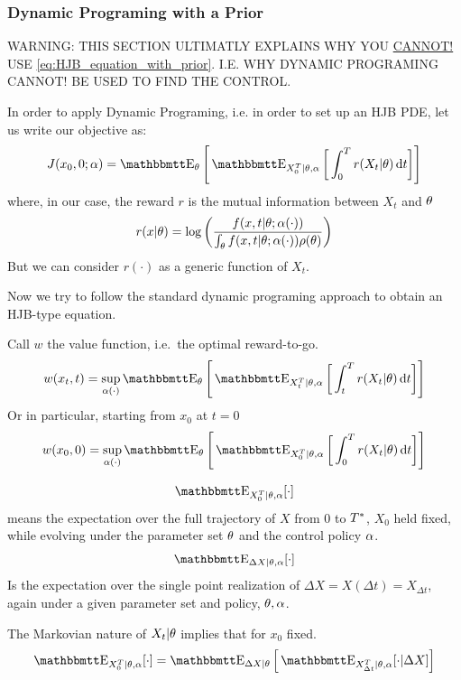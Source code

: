 \documentclass{article}
\begin{document}
\subsubsection{Dynamic Programing with a Prior}
\label{sec:DP_with_a_prior}

WARNING: THIS SECTION ULTIMATLY EXPLAINS WHY YOU \underline{CANNOT!} USE
\cref{eq:HJB_equation_with_prior}. I.E. WHY DYNAMIC PROGRAMING CANNOT! BE
USED TO FIND THE CONTROL. 


In order to apply Dynamic Programing, i.e. in order to set up an HJB PDE, let us
write our objective as:
\begin{equation}
J(x_0, 0; \a) = \Exp_\th \Bigg[ \Exp_{X_0^T|\th, \a} \bigg[ \int_0^T r(X_t|
\th)\intd{t} \bigg]\Bigg]
\label{eq:stochastic_objective_with_prior_generic} 
\end{equation}
where, in our case, the reward $r$ is the mutual information between $X_t$ and
${\theta}$ 
\begin{equation}
r(x|{\theta}) = \log\left(\frac{f(x,t|{\theta}; {\alpha}(\cdot))}
{\int_{\theta} f(x,t|{\theta}; {\alpha}(\cdot)) \rho({\theta})}\right)
\label{eq:reward_funciont_mutual_information}
\end{equation}
But we can consider $r(\cdot)$ as a generic function of $X_t$.

Now we try to follow the standard dynamic programing approach to obtain an
HJB-type equation. 

Call $w$ the value function, i.e.\ the optimal reward-to-go.
\begin{equation}
w(x_t, t) = \sup_{\a(\cdot)} 
\Exp_\th \Bigg[ \Exp_{X_t^T|\th, \a} \bigg[ \int_t^T r(X_t| \th) \intd{t}
\bigg]\Bigg]
\label{eq:value_function_with_prior_defn}
\end{equation}
Or in particular, starting from $x_0$ at $t=0$ 
\begin{equation}
w(x_0, 0) = \sup_{\a(\cdot)} 
\Exp_\th \Bigg[ \Exp_{X_0^T|\th, \a} \bigg[ \int_0^T r(X_t| \th) \intd{t}
\bigg]\Bigg]
\end{equation} 

$$
\Exp_{X_0^T|\th, \a} [\cdot] 
$$
means the expectation over the full trajectory of $X$ from $0$ to ${ T^* }$, $X_0$
held fixed, while evolving under the parameter set ${\theta}$ and the control
policy ${\alpha}$.
$$
\Exp_{\Delta X|\th, \a} [\cdot] 
$$
Is the expectation over the single point realization of $\Delta X = X(\Delta t)
= X_{\Delta t}$, again under a given parameter set and policy, ${\theta}, {\alpha}$.

The Markovian nature of $X_t|{\theta}$ implies that for $x_0$ fixed.
$$
\Exp_{X_0^T|\th, \a} [\cdot ] =
\Exp_{\Delta X|\th} \Big[ \Exp_{X_{\Delta t}^T|\th, \a} [ \cdot  | \Delta X ]
\Big] $$
\end{document}
